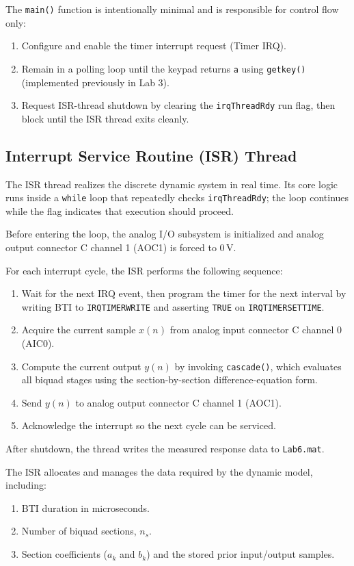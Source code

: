 \documentclass[10pt,twocolumn]{article}
\begin{document}
The \texttt{main()} function is intentionally minimal and is responsible for control flow only:
\begin{enumerate}
	\item Configure and enable the timer interrupt request (Timer IRQ).
	\item Remain in a polling loop until the keypad returns \texttt{a} using \texttt{getkey()} (implemented previously in Lab 3).
	\item Request ISR-thread shutdown by clearing the \texttt{irqThreadRdy} run flag, then block until the ISR thread exits cleanly.
\end{enumerate}

\subsection{Interrupt Service Routine (ISR) Thread}
The ISR thread realizes the discrete dynamic system in real time. Its core logic runs inside a \texttt{while} loop that repeatedly checks \texttt{irqThreadRdy}; the loop continues while the flag indicates that execution should proceed.

Before entering the loop, the analog I/O subsystem is initialized and analog output connector C channel 1 (AOC1) is forced to $0\,\text{V}$.

For each interrupt cycle, the ISR performs the following sequence:
\begin{enumerate}
	\item Wait for the next IRQ event, then program the timer for the next interval by writing BTI to \texttt{IRQTIMERWRITE} and asserting \texttt{TRUE} on \texttt{IRQTIMERSETTIME}.
	\item Acquire the current sample $x(n)$ from analog input connector C channel 0 (AIC0).
	\item Compute the current output $y(n)$ by invoking \texttt{cascade()}, which evaluates all biquad stages using the section-by-section difference-equation form.
	\item Send $y(n)$ to analog output connector C channel 1 (AOC1).
	\item Acknowledge the interrupt so the next cycle can be serviced.
\end{enumerate}

After shutdown, the thread writes the measured response data to \texttt{Lab6.mat}.

The ISR allocates and manages the data required by the dynamic model, including:
\begin{enumerate}
	\item BTI duration in microseconds.
	\item Number of biquad sections, $n_s$.
	\item Section coefficients ($a_k$ and $b_k$) and the stored prior input/output samples.
\end{enumerate}
\end{document}
